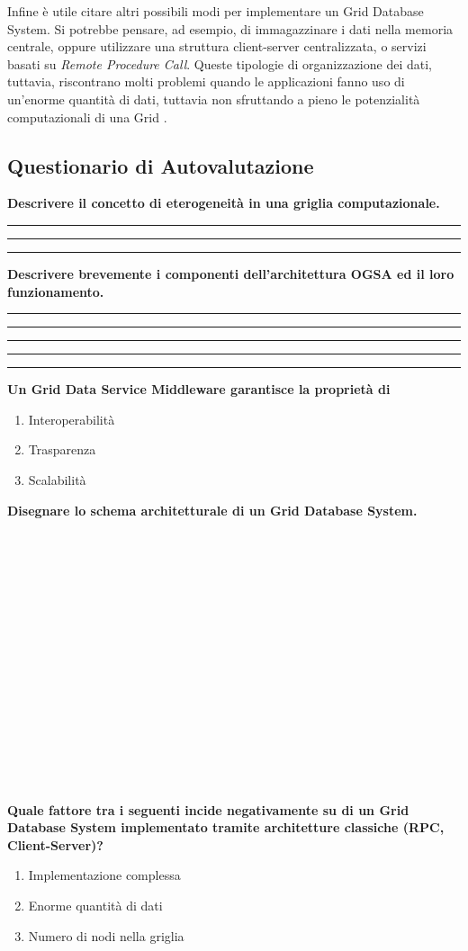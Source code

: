 \documentclass[11pt]{article}
\newcommand{\voceU}[1]{%
	\item #1\dotfill\Square%
}
\begin{document}
Infine è utile citare altri possibili modi per implementare un Grid Database System. Si potrebbe pensare, ad esempio, di immagazzinare i dati nella memoria centrale, oppure utilizzare una struttura client-server centralizzata, o servizi basati su \emph{Remote Procedure Call}. Queste tipologie di organizzazione dei dati, tuttavia, riscontrano molti problemi quando le applicazioni fanno uso di un'enorme quantità di dati, tuttavia non sfruttando a pieno le potenzialità computazionali di una Grid \cite{3}.

\newpage

\subsection{Questionario di Autovalutazione}

\textbf{Descrivere il concetto di eterogeneità in una griglia computazionale.}\\[4ex]
\rule[5mm]{\textwidth}{0.1mm} 
\rule[5mm]{\textwidth}{0.1mm}
\rule[5mm]{\textwidth}{0.1mm} 
\textbf{Descrivere brevemente i componenti dell'architettura OGSA ed il loro funzionamento.}\\[4ex]
\rule[5mm]{\textwidth}{0.1mm} 
\rule[5mm]{\textwidth}{0.1mm}
\rule[5mm]{\textwidth}{0.1mm} 
\rule[5mm]{\textwidth}{0.1mm}
\rule[5mm]{\textwidth}{0.1mm} 
\textbf{Un Grid Data Service Middleware garantisce la proprietà di}
\begin{enumerate}
	\voceU{Interoperabilità}
	\voceU{Trasparenza}
	\voceU{Scalabilità}\\
\end{enumerate}
\textbf{Disegnare lo schema architetturale di un Grid Database System.}\\\\\\\\\\\\\\\\\\\\\\\\\\\\\\\\\\
\textbf{Quale fattore tra i seguenti incide negativamente su di un Grid Database System implementato tramite architetture classiche (RPC, Client-Server)?}
\begin{enumerate}
	\voceU{Implementazione complessa}
	\voceU{Enorme quantità di dati}
	\voceU{Numero di nodi nella griglia}\\
\end{enumerate}
\newpage
\end{document}
